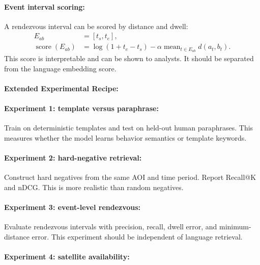 \documentclass{article}
\begin{document}
\paragraph{Event interval scoring:}

A rendezvous interval can be scored by distance and dwell:
\begin{equation}
\begin{aligned}
E_{ab}&=[t_s,t_e],\\
\operatorname{score}(E_{ab})&=\log(1+t_e-t_s)
-\alpha\operatorname{mean}_{t\in E_{ab}}d(a_t,b_t).
\end{aligned}
\end{equation}
This score is interpretable and can be shown to analysts. It should be separated from the language embedding score.

\paragraph{Extended Experimental Recipe:}

\paragraph{Experiment 1: template versus paraphrase:}

Train on deterministic templates and test on held-out human paraphrases. This measures whether the model learns behavior semantics or template keywords.

\paragraph{Experiment 2: hard-negative retrieval:}

Construct hard negatives from the same AOI and time period. Report Recall@K and nDCG. This is more realistic than random negatives.

\paragraph{Experiment 3: event-level rendezvous:}

Evaluate rendezvous intervals with precision, recall, dwell error, and minimum-distance error. This experiment should be independent of language retrieval.

\paragraph{Experiment 4: satellite availability:}
\end{document}
